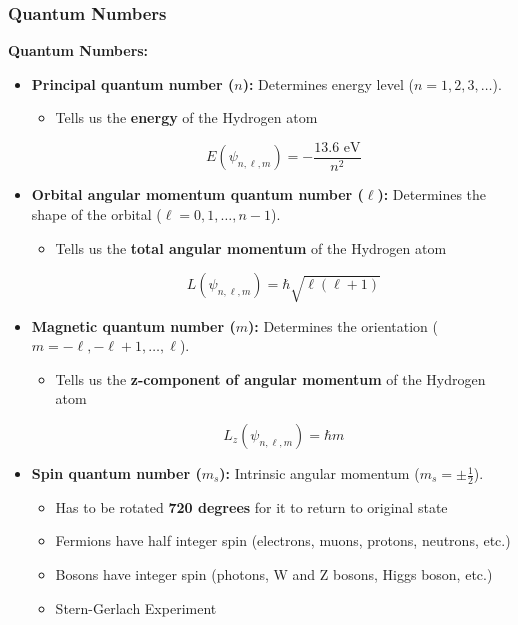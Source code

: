 \documentclass{article}
\newcommand{\eqbox}[1]{\begin{tcolorbox}[colback=gray!10] #1 \end{tcolorbox}}
\newcommand{\conceptbox}[1]{\begin{tcolorbox}[colback=blue!10] #1 \end{tcolorbox}}
\begin{document}
\subsubsection{Quantum Numbers}
\conceptbox{
\textbf{Quantum Numbers:}
\begin{itemize}
    \item \textbf{Principal quantum number (\( n \)):} Determines energy level (\( n = 1, 2, 3, \dots \)).
    \begin{itemize}
        \item Tells us the \textbf{energy} of the Hydrogen atom
        \eqbox{
            \[
                E(\psi_{n, \ell, m}) = -\frac{13.6\text{ eV}}{n^2}
            \]
        }
    \end{itemize}
    \item \textbf{Orbital angular momentum quantum number (\( \ell \)):} Determines the shape of the orbital (\( \ell = 0, 1, \dots, n-1 \)).
    \begin{itemize}
        \item Tells us the \textbf{total angular momentum} of the Hydrogen atom
        \eqbox{
            \[
                L(\psi_{n, \ell, m}) = \hbar \sqrt{\ell(\ell + 1)}
            \]
        }
    \end{itemize}
    \item \textbf{Magnetic quantum number (\( m \)):} Determines the orientation (\( m = -\ell, -\ell+1, \dots, \ell \)).
    \begin{itemize}
        \item Tells us the \textbf{z-component of angular momentum} of the Hydrogen atom
        \eqbox{
            \[
                L_z(\psi_{n, \ell, m}) = \hbar m
            \]
        }
    \end{itemize}
    \item \textbf{Spin quantum number (\( m_s \)):} Intrinsic angular momentum (\( m_s = \pm \frac{1}{2} \)).
    \begin{itemize}
        \item Has to be rotated \textbf{720 degrees} for it to return to original state
        \item Fermions have half integer spin (electrons, muons, protons, neutrons, etc.)
        \item Bosons have integer spin (photons, W and Z bosons, Higgs boson, etc.)
        \item Stern-Gerlach Experiment
    \end{itemize}
\end{itemize}
}
\end{document}
